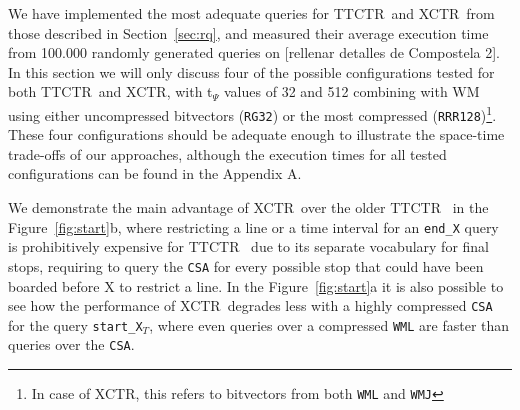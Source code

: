 \documentclass[runningheads]{llncs}
\newcommand{\ctr}{XCTR}
\newcommand{\ttctr}{TTCTR}
\begin{document}
We have implemented the most adequate queries for \ttctr~and \ctr~from those described in Section~\ref{sec:rq}, and measured their average execution time from 100.000 randomly generated queries on [rellenar detalles de Compostela 2]. In this section we will only discuss four of the possible configurations tested for both \ttctr~and \ctr, with t$_{\Psi}$ values of 32 and 512 combining with WM using either uncompressed bitvectors (\texttt{RG32}) or the most compressed (\texttt{RRR128})\footnote{In case of \ctr, this refers to bitvectors from both \texttt{WML} and \texttt{WMJ}}. These four configurations should be adequate enough to illustrate the space-time trade-offs of our approaches, although the execution times for all tested configurations can be found in the Appendix A.

We demonstrate the main advantage of \ctr~over the older \ttctr~ in the Figure~\ref{fig:start}b, where restricting a line or a time interval for an \texttt{end\_X} query is prohibitively expensive for \ttctr~ due to its separate vocabulary for final stops, requiring to query the \texttt{CSA} for every possible stop that could have been boarded before X to restrict a line. In the Figure~\ref{fig:start}a it is also possible to see how the performance of \ctr~degrades less with a highly compressed \texttt{CSA} for the query \texttt{start\_X$_T$}, where even queries over a compressed \texttt{WML} are faster than queries over the \texttt{CSA}.

\end{document}
